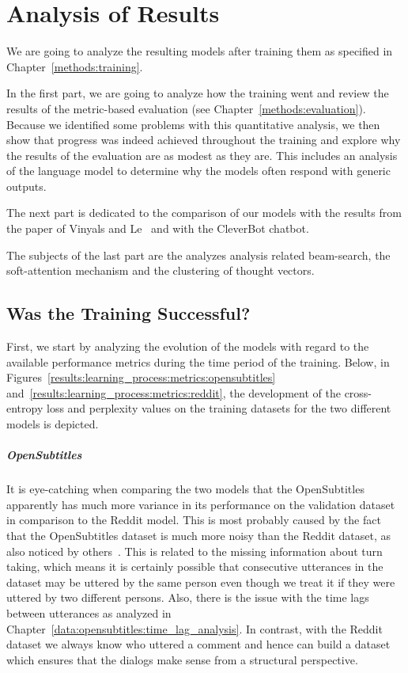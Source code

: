 \chapter{Analysis of Results}
We are going to analyze the resulting models after training them as specified in Chapter~\ref{methods:training}.

In the first part, we are going to analyze how the training went and review the results of the metric-based evaluation (see Chapter~\ref{methods:evaluation}). Because we identified some problems with this quantitative analysis, we then show that progress was indeed achieved throughout the training and explore why the results of the evaluation are as modest as they are. This includes an analysis of the language model to determine why the models often respond with generic outputs.

The next part is dedicated to the comparison of our models with the results from the paper of Vinyals and Le~\cite{Vinyals:2015} and with the CleverBot chatbot.

The subjects of the last part are the analyzes analysis related beam-search, the soft-attention mechanism and the clustering of thought vectors.

\section{Was the Training Successful?}
First, we start by analyzing the evolution of the models with regard to the available performance metrics during the time period of the training. Below, in Figures~\ref{results:learning_process:metrics:opensubtitles} and~\ref{results:learning_process:metrics:reddit}, the development of the cross-entropy loss and perplexity values on the training datasets for the two different models is depicted.

\paragraph{OpenSubtitles} It is eye-catching when comparing the two models that the OpenSubtitles apparently has much more variance in its performance on the validation dataset in comparison to the Reddit model. This is most probably caused by the fact that the OpenSubtitles dataset is much more noisy than the Reddit dataset, as also noticed by others~\cite{Vinyals:2015}. This is related to the missing information about turn taking, which means it is certainly possible that consecutive utterances in the dataset may be uttered by the same person even though we treat it if they were uttered by two different persons. Also, there is the issue with the time lags between utterances as analyzed in Chapter~\ref{data:opensubtitles:time_lag_analysis}. In contrast, with the Reddit dataset we always know who uttered a comment and hence can build a dataset which ensures that the dialogs make sense from a structural perspective.

